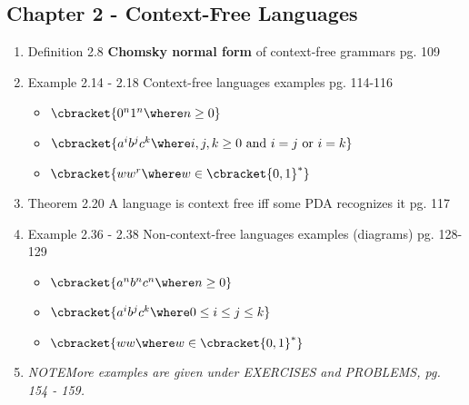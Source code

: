 \documentclass[12pt]{article} %
\newcommand{\theoremitem}[3]{\item #1 \quad #2 \dotfill #3}
\newcommand{\noteitem}[1]{\item \textit{NOTE\quad #1}}
\newenvironment{theoremlist} {
    \begin{enumerate}[nosep,leftmargin=*,label={}]
} {
    \end{enumerate}
}
\begin{document}
\subsection{Chapter 2 - Context-Free Languages}
\begin{theoremlist}
    \theoremitem{Definition 2.8}
    {\textbf{Chomsky normal form} of context-free grammars}
    {pg. 109}
    \theoremitem{Example 2.14 - 2.18}
    {Context-free languages examples}
    {pg. 114-116}
    \begin{multicols}{2}
    \begin{itemize}[nosep]
        \item {$\cbracket{0^n 1^n \where n \geq 0}$}
        \item {$\cbracket{a^i b^j c^k \where i,j,k \geq 0 \text{ and } i=j \text{ or } i=k}$}
        \item {$\cbracket{ww^r \where w \in \cbracket{0,1}^*}$}
    \end{itemize}
    \end{multicols}
    \theoremitem{Theorem 2.20}
    {A language is context free iff some PDA recognizes it}
    {pg. 117}
    \theoremitem{Example 2.36 - 2.38}
    {Non-context-free languages examples (diagrams)}
    {pg. 128-129}
    \begin{multicols}{2}
    \begin{itemize}[nosep]
        \item {$\cbracket{a^n b^n c^n \where n \geq 0}$}
        \item {$\cbracket{a^i b^j c^k \where 0 \leq i \leq j \leq k}$}
        \item {$\cbracket{ww \where w \in \cbracket{0,1}^*}$}
    \end{itemize}
    \end{multicols}
    \noteitem{More examples are given under {\normalfont EXERCISES} and {\normalfont PROBLEMS}, pg. 154 - 159.}
\end{theoremlist}
\end{document}
